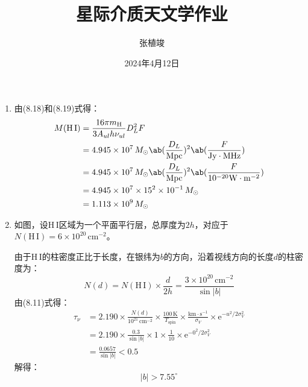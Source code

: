 \documentclass[a4paper,fontset=none]{ctexart}
\title{\textbf{星际介质天文学作业}}
\author{张植竣}
\date{2024年4月12日}
\begin{document}
\maketitle

\begin{enumerate}
    \item[8.6]
    由(8.18)和(8.19)式得：
    \begin{align*}
        M(\mathrm{H\,I})
        &= \frac{16\pi m_{\mathrm{H}}}{3A_{ul} h\nu_{ul}} D_L^2 F \\
        &= 4.945 \times 10^7\,M_\odot \ab(\frac{D_L}{\mathrm{Mpc}})^2 \ab(\frac{F}{\mathrm{Jy \cdot MHz}}) \\
        &= 4.945 \times 10^7\,M_\odot \ab(\frac{D_L}{\mathrm{Mpc}})^2 \ab(\frac{F}{10^{-20} \mathrm{W \cdot m^{-2}}}) \\
        &= 4.945 \times 10^7 \times 15^2 \times 10^{-1}\,M_\odot \\
        &= 1.113 \times 10^9\,M_\odot
    \end{align*}

    \bigskip
    \item[29.1 (a)]
    如图，设$\mathrm{H\,I}$区域为一个平面平行层，总厚度为$2h$，对应于$N(\mathrm{H\,I}) = 6 \times 10^{20}\,\mathrm{cm^{-2}}$。

    \begin{center}
    \end{center}

    由于$\mathrm{H\,I}$的柱密度正比于长度，在银纬为$b$的方向，沿着视线方向的长度$d$的柱密度为：
    \[
        N(d) = N(\mathrm{H\,I}) \times \frac{d}{2h} = \frac{3 \times 10^{20}\,\mathrm{cm^{-2}}}{\sin|b|}
    \]
    由(8.11)式得：
    \begin{align*}
        \tau_\nu
        &= 2.190 \times \frac{N(d)}{10^{21}\,\mathrm{cm^{-2}}} \times \frac{100\,\mathrm{K}}{T_{\mathrm{spin}}} \times \frac{\mathrm{km \cdot s^{-1}}}{\sigma_V} \times \mathrm{e}^{-u^2/2\sigma_V^2} \\
        &= 2.190 \times \frac{0.3}{\sin|b|} \times 1 \times \frac{1}{10} \times \mathrm{e}^{-0^2/2\sigma_V^2} \\
        &= \frac{0.0657}{\sin|b|}
        < 0.5
    \end{align*}
    解得：
    \[
        |b| > 7.55^\circ
    \]


\end{enumerate}
\end{document}

